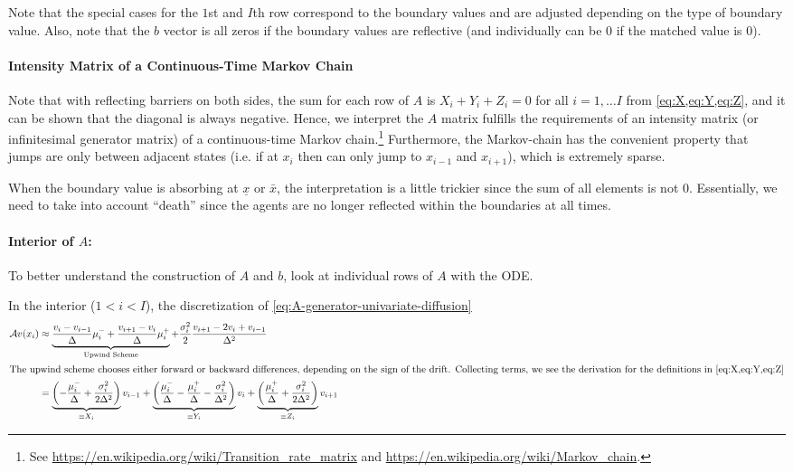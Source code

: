 \documentclass[11pt]{etk-article}
\begin{document}
Note that the special cases for the $1$st and $I$th row correspond to the boundary values and are adjusted depending on the type of boundary value. Also, note that the $b$ vector is all zeros if the boundary values are reflective (and individually can be $0$ if the matched value is $0$).

\paragraph{Intensity Matrix of a Continuous-Time Markov Chain}
Note that with reflecting barriers on both sides, the sum for each row of $A$ is $X_i +Y_i + Z_i = 0$ for all $i = 1, \ldots I$ from \cref{eq:X,eq:Y,eq:Z}, and it can be shown that the diagonal is always negative.  Hence, we interpret the $A$ matrix fulfills the requirements of an intensity matrix (or infinitesimal generator matrix) of a continuous-time Markov chain.\footnote{See \url{https://en.wikipedia.org/wiki/Transition_rate_matrix} and \url{https://en.wikipedia.org/wiki/Markov_chain}.}  Furthermore, the Markov-chain has the convenient property that jumps are only between adjacent states (i.e. if at $x_i$ then can only jump to $x_{i-1}$ and $x_{i+1}$), which is extremely sparse.

When the boundary value is absorbing at $\underline{x}$ or $\bar{x}$, the interpretation is a little trickier since the sum of all elements is not $0$.  Essentially, we need to take into account ``death'' since the agents are no longer reflected within the boundaries at all times.


\paragraph{Interior of $A$:}
To better understand the construction of $A$ and $b$, look at individual rows of $A$ with the ODE.

In the interior ($1 < i < I$), the discretization of \cref{eq:A-generator-univariate-diffusion}
\begin{align}
\mathcal{A} v(x_i) &\approx \underbrace{\frac{v_i-v_{i-1}}{\Delta}\mu_i^{-}+ \frac{v_{i+1}-v_i}{\Delta}\mu_i^{+}}_{\text{Upwind Scheme}}  + \frac{\sigma_i^2}{2} \frac{v_{i+1} - 2 v_i + v_{i-1}}{\Delta^2}\label{eq:A-generator-univariate-diffusion-interior}\\
\intertext{The upwind scheme chooses either forward or backward differences, depending on the sign of the drift.  Collecting terms, we see the derivation for the definitions in \cref{eq:X,eq:Y,eq:Z}}
&= \underbrace{\left(-\frac{\mu_i^{-}}{\Delta} +\frac{\sigma_i^2}{2\Delta^2}\right)}_{\equiv X_i}v_{i-1} + \underbrace{\left(\frac{\mu_i^{-}}{\Delta} - \frac{\mu_i^{+}}{\Delta}-\frac{\sigma_i^2}{\Delta^2}\right)}_{\equiv Y_i}v_i + \underbrace{\left(\frac{\mu_i^{+}}{\Delta} + \frac{\sigma_i^2}{2\Delta^2}\right)}_{\equiv Z_i}v_{i+1}\label{eq:A-collected-interior}
\end{align}
\end{document}
